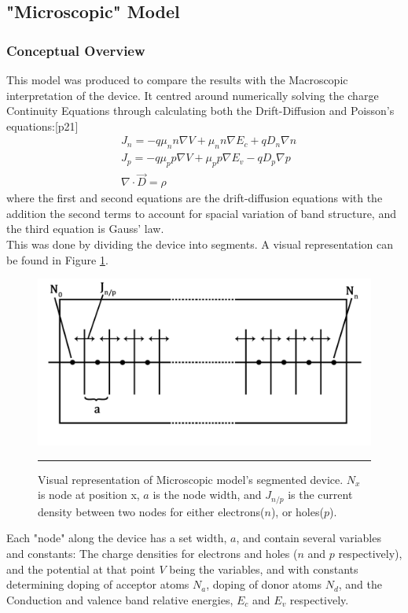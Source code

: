 \documentclass[titlepage]{article}
\begin{document}
\subsection{"Microscopic" Model}
\subsubsection{Conceptual Overview}
This model was produced to compare the results with the Macroscopic interpretation of the device. It centred around numerically solving the charge Continuity Equations through calculating both the Drift-Diffusion and Poisson's equations:\cite{Frensley}[p21]
\begin{eqnarray}
	&J_n = -q\mu_n n\nabla V + \mu_n n \nabla E_c + q D_n \nabla n\\
	&J_p = -q\mu_p p\nabla V + \mu_p p \nabla E_v - q D_p \nabla p\\
	&\nabla\cdot\vec{D} = \rho
\end{eqnarray}
where the first and second equations are the drift-diffusion equations with the addition the second terms to account for spacial variation of band structure, and the third equation is Gauss' law.\\ 
This was done by dividing the device into segments. A visual representation can be found in Figure \ref{fig:Mic:Segment}.\\
\begin{figure}
	\centering
	\includegraphics[scale=0.15]{Figures/Segmented}
	\caption{\label{fig:Mic:Segment}Visual representation of Microscopic model's segmented device. $N_x$ is node at position x, $a$ is the node width, and $J_{n/p}$ is the current density between two nodes for either electrons($n$), or holes($p$).}
	\hrule
\end{figure}
Each "node" along the device has a set width, $a$, and contain several variables and constants: The charge densities for electrons and holes ($n$ and $p$ respectively), and the potential at that point $V$ being the variables, and with constants determining doping of acceptor atoms $N_a$, doping of donor atoms $N_d$, and the Conduction and valence band relative energies, $E_c$ and $E_v$ respectively. \\
\end{document}

